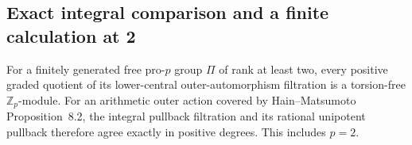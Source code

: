 \subsection{Exact integral comparison and a finite calculation at 2}

\begin{proposition}\label{prop:outer-sat}
For a finitely generated free pro-$p$ group $\Pi$ of rank at least
two, every positive graded quotient of its lower-central
outer-automorphism filtration is a torsion-free $\mathbb Z_p$-module.
For an arithmetic outer action covered by Hain--Matsumoto
Proposition~8.2, the integral pullback filtration and its rational
unipotent pullback therefore agree exactly in positive degrees.
This includes $p=2$.
\end{proposition}

